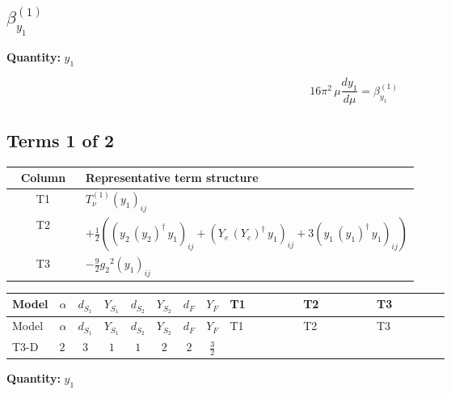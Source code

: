\documentclass[8pt]{article}
\begin{document}
\begin{landscape}
\section*{$\beta_{y_1}^{(1)}$}
\noindent\textbf{Quantity: }$y_1$\par\smallskip
\[16\pi^2\,\mu\frac{d y_1}{d\mu}=\beta_{y_1}^{(1)}\]
\subsection*{Terms 1 of 2}
\begin{center}
\begin{tabular}{@{}c >{\raggedright\arraybackslash}p{0.82\linewidth}@{}}
\toprule
Column & Representative term structure \\
\midrule
T1 & \(\displaystyle T_{\nu}^{(1)} \left({y_1}\right)_{ij}\) \\
\midrule
T2 & \(\displaystyle +\frac{1}{2} (\left({y_2}\,\left({y_2}\right)^{\dagger}\,{y_1}\right)_{ij}+\left({Y_e}\,\left({Y_e}\right)^{\dagger}\,{y_1}\right)_{ij}+3 \left({y_1}\,\left({y_1}\right)^{\dagger}\,{y_1}\right)_{ij})\) \\
\midrule
T3 & \(\displaystyle -\frac{9}{2} {g_2}^2 \left({y_1}\right)_{ij}\) \\
\midrule
\bottomrule
\end{tabular}
\end{center}
\smallskip
\tiny
\begin{longtable}{@{}llcccccc >{\raggedright\arraybackslash}p{0.21\linewidth} >{\raggedright\arraybackslash}p{0.21\linewidth} >{\raggedright\arraybackslash}p{0.21\linewidth}@{}}
\toprule
Model & $\alpha$ & $d_{S_1}$ & $Y_{S_1}$ & $d_{S_2}$ & $Y_{S_2}$ & $d_F$ & $Y_F$ & T1 & T2 & T3 \\
\midrule
\endfirsthead
\toprule
Model & $\alpha$ & $d_{S_1}$ & $Y_{S_1}$ & $d_{S_2}$ & $Y_{S_2}$ & $d_F$ & $Y_F$ & T1 & T2 & T3 \\
\midrule
\endhead
T3-D & $2$ & $3$ & $1$ & $1$ & $2$ & $2$ & $\frac{3}{2}$ & \scriptsize\adjustbox{max width=\linewidth}{$\begin{gathered} T_{\nu}^{(1)} \left({y_1}\right)_{ij}\end{gathered}$} & \scriptsize\adjustbox{max width=\linewidth}{$\begin{gathered} +\frac{1}{2} (\left({y_2}\,\left({y_2}\right)^{\dagger}\,{y_1}\right)_{ij}+\left({Y_e}\,\left({Y_e}\right)^{\dagger}\,{y_1}\right)_{ij}+3 \left({y_1}\,\left({y_1}\right)^{\dagger}\,{y_1}\right)_{ij})\end{gathered}$} & \scriptsize\adjustbox{max width=\linewidth}{$\begin{gathered} -\frac{9}{2} {g_2}^2 \left({y_1}\right)_{ij}\end{gathered}$} \\
\midrule
\bottomrule
\end{longtable}
\clearpage
\noindent\textbf{Quantity: }$y_1$\par\smallskip

\end{landscape}
\end{document}
